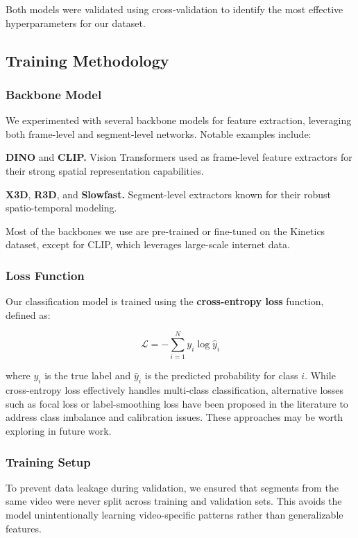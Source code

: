 Both models were validated using cross-validation to identify the most effective hyperparameters for our dataset.


\subsection{Training Methodology}

\subsubsection*{Backbone Model}
We experimented with several backbone models for feature extraction, leveraging both frame-level and segment-level networks. Notable examples include:

\noindent\textbf{\small{DINO}} and \noindent\textbf{\small{CLIP.}} Vision Transformers used as frame-level feature extractors for their strong spatial representation capabilities.

\noindent\textbf{\small{X3D}}, \noindent\textbf{\small{R3D}}, and \noindent\textbf{\small{Slowfast.}} Segment-level extractors known for their robust spatio-temporal modeling.

Most of the backbones we use are pre-trained or fine-tuned on the Kinetics dataset, except for CLIP, which leverages large-scale internet data.

\subsubsection*{Loss Function}
Our classification model is trained using the \textbf{cross-entropy loss} function, defined as:

\[
\mathcal{L} = -\sum_{i=1}^{N} y_i \log \hat{y}_i
\]

where \(y_i\) is the true label and \(\hat{y}_i\) is the predicted probability for class \(i\). While cross-entropy loss effectively handles multi-class classification, alternative losses such as focal loss or label-smoothing loss have been proposed in the literature to address class imbalance and calibration issues. These approaches may be worth exploring in future work.

\subsubsection*{Training Setup}

To prevent data leakage during validation, we ensured that segments from the same video were never split across training and validation sets. This avoids the model unintentionally learning video-specific patterns rather than generalizable features.

